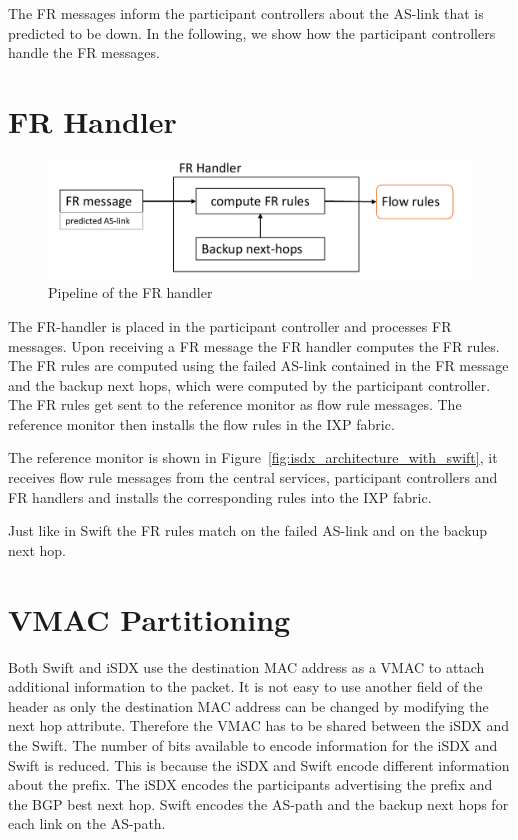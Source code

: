 The FR messages inform the participant controllers about the AS-link that is predicted to be down. In the following, we show how the participant controllers handle the FR messages.


\section{\label{chapter4:FR-handler}FR Handler}

\begin{figure}[h]
\center
\includegraphics[scale = 0.6]{Figures/design_fr_handler_cropped.pdf}
\caption{Pipeline of the FR handler}
\end{figure}

The FR-handler is placed in the participant controller and processes FR messages.
Upon receiving a FR message the FR handler computes the FR rules. The FR rules are computed using the failed AS-link contained in the FR message and the backup next hops, which were computed by the participant controller. 
The FR rules get sent to the reference monitor as flow rule messages. The reference monitor then installs the flow rules in the IXP fabric.

The reference monitor is shown in Figure~\ref{fig:isdx_architecture_with_swift}, it receives flow rule messages from the central services, participant controllers and FR handlers and installs the corresponding rules into the IXP fabric. 

Just like in Swift the FR rules match on the failed AS-link and on the backup next hop.    

\newpage

\section{\label{chapter4:vmac_partitioning}VMAC Partitioning}

Both Swift and iSDX use the destination MAC address as a VMAC to attach additional information to the packet. It is not easy to use another field of the header as only the destination MAC address can be changed by modifying the next hop attribute. Therefore the VMAC has to be shared between the iSDX and the Swift. The number of bits available to encode information for the iSDX and Swift is reduced. This is because the iSDX and Swift encode different information about the prefix. The iSDX encodes the participants advertising the prefix and the BGP best next hop. Swift encodes the AS-path and the backup next hops for each link on the AS-path.

